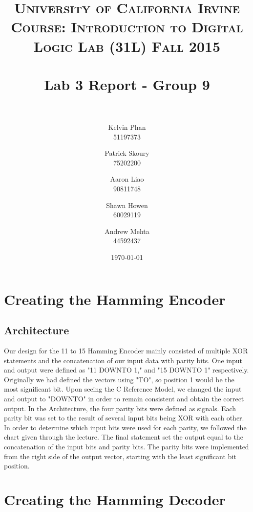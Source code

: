 \documentclass[paper=letter, fontsize=11pt]{scrartcl}
\title{	
\normalfont \normalsize 
\textsc{University of California Irvine} \\  %
\textsc{Course: Introduction to Digital Logic Lab (31L) Fall 2015} \\ [25pt]
\horrule{0.5pt} \\[0.4cm] %
\huge Lab 3 Report - Group 9\\ %
\horrule{2pt} \\[0.5cm] %
}
\author{Kelvin Phan \\ 51197373
	\and
	Patrick Skoury \\ 75202200
	\and
	Aaron Liao \\ 90811748
	\and
	Shawn Howen \\ 60029119
	\and
	Andrew Mehta \\ 44592437
}
\date{\large\today} %
\numberwithin{equation}{section} %
\numberwithin{figure}{section} %
\numberwithin{table}{section} %
\begin{document}
\maketitle %


\section{Creating the Hamming Encoder}

\subsection{Architecture}
\begin{flushleft}
	Our design for the 11 to 15 Hamming Encoder mainly consisted of multiple XOR statements and the concatenation of our input data with parity bits. One input and output were defined as "11 DOWNTO 1," and "15 DOWNTO 1" respectively. Originally we had defined the vectors using "TO", so position 1 would be the most significant bit. Upon seeing the C Reference Model, we changed the input and output to "DOWNTO" in order to remain consistent and obtain the correct output. In the Architecture, the four parity bits were defined as signals. Each parity bit was set to the result of several input bits being XOR with each other. In order to determine which input bits were used for each parity, we followed the chart given through the lecture. The final statement set the output equal to the concatenation of the input bits and parity bits. The parity bits were implemented from the right side of the output vector, starting with the least significant bit position. \\[20pt]
\end{flushleft}


\section{Creating the Hamming Decoder}
\end{document}
